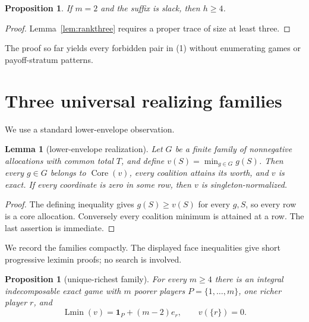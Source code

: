 \documentclass[11pt]{article}
\newtheorem{lemma}[theorem]{Lemma}
\newtheorem{proposition}[theorem]{Proposition}
\newcommand{\core}{\operatorname{Core}}
\newcommand{\Lmin}{\operatorname{Lmin}}
\newcommand{\one}{\mathbf 1}
\begin{document}
\begin{proposition}\label{prop:m2}
If $m=2$ and the suffix is slack, then $h\ge4$.
\end{proposition}

\begin{proof}
Lemma~\ref{lem:rankthree} requires a proper trace of size at least three.
\end{proof}

The proof so far yields every forbidden pair in (1) without enumerating
games or payoff-stratum patterns.

\section{Three universal realizing families}

We use a standard lower-envelope observation.

\begin{lemma}[lower-envelope realization]\label{lem:envelope}
Let $G$ be a finite family of nonnegative allocations with common total
$T$, and define $v(S)=\min_{g\in G}g(S)$.  Then every $g\in G$ belongs to
$\core(v)$, every coalition attains its worth, and $v$ is exact.  If every
coordinate is zero in some row, then $v$ is singleton-normalized.
\end{lemma}

\begin{proof}
The defining inequality gives $g(S)\ge v(S)$ for every $g,S$, so every row
is a core allocation.  Conversely every coalition minimum is attained at a
row.  The last assertion is immediate.
\end{proof}

We record the families compactly.  The displayed face inequalities give
short progressive leximin proofs; no search is involved.

\begin{proposition}[unique-richest family]\label{prop:family1}
For every $m\ge4$ there is an integral indecomposable exact game with
$m$ poorer players $P=\{1,\ldots,m\}$, one richer player $r$, and
\[
 \Lmin(v)=\one_P+(m-2)e_r,\qquad v(\{r\})=0.
\]
\end{proposition}
\end{document}
